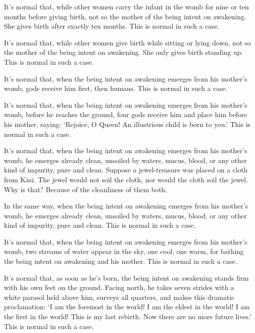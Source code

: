 \documentclass[12pt,openany]{book}%
\begin{document}
It’s normal that, while other women carry the infant in the womb for nine or ten months before giving birth, not so the mother of the being intent on awakening. She gives birth after exactly ten months. This is normal in such a case. 

It’s normal that, while other women give birth while sitting or lying down, not so the mother of the being intent on awakening. She only gives birth standing up. This is normal in such a case. 

It’s normal that, when the being intent on awakening emerges from his mother’s womb, gods receive him first, then humans. This is normal in such a case. 

It’s normal that, when the being intent on awakening emerges from his mother’s womb, before he reaches the ground, four gods receive him and place him before his mother, saying: ‘Rejoice, O Queen! An illustrious child is born to you.’ This is normal in such a case. 

It’s normal that, when the being intent on awakening emerges from his mother’s womb, he emerges already clean, unsoiled by waters, mucus, blood, or any other kind of impurity, pure and clean. Suppose a jewel-treasure was placed on a cloth from \textsanskrit{Kāsī}. The jewel would not soil the cloth, nor would the cloth soil the jewel. Why is that? Because of the cleanliness of them both. 

In the same way, when the being intent on awakening emerges from his mother’s womb, he emerges already clean, unsoiled by waters, mucus, blood, or any other kind of impurity, pure and clean. This is normal in such a case. 

It’s normal that, when the being intent on awakening emerges from his mother’s womb, two streams of water appear in the sky, one cool, one warm, for bathing the being intent on awakening and his mother. This is normal in such a case. 

It’s normal that, as soon as he’s born, the being intent on awakening stands firm with his own feet on the ground. Facing north, he takes seven strides with a white parasol held above him, surveys all quarters, and makes this dramatic proclamation: ‘I am the foremost in the world! I am the eldest in the world! I am the first in the world! This is my last rebirth. Now there are no more future lives.’ This is normal in such a case. 
\end{document}
